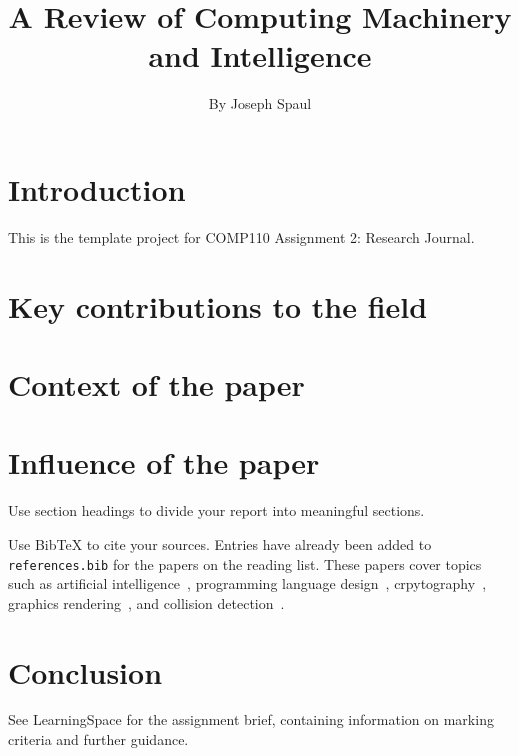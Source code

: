\documentclass{article}
\title{A Review of Computing Machinery and Intelligence}
\author{By Joseph Spaul}
\begin{document}
\maketitle

\section{Introduction}

This is the template project for COMP110 Assignment 2: Research Journal.

\section{Key contributions to the field}

\section{Context of the paper}

\section{Influence of the paper}

Use section headings to divide your report into meaningful sections.

Use BibTeX to cite your sources. Entries have already been added to \texttt{references.bib} for the papers on the reading list.
These papers cover topics such as artificial intelligence~\cite{turing1950_intelligence, knuth1975_alphabeta}, programming language design~\cite{dijkstra1968_goto}, crpytography~\cite{rivest1978_rsa}, graphics rendering~\cite{phong1975_illumination}, and collision detection~\cite{gilbert1988_gjk}.

\section{Conclusion}

See LearningSpace for the assignment brief, containing information on marking criteria and further guidance.











\end{document}
